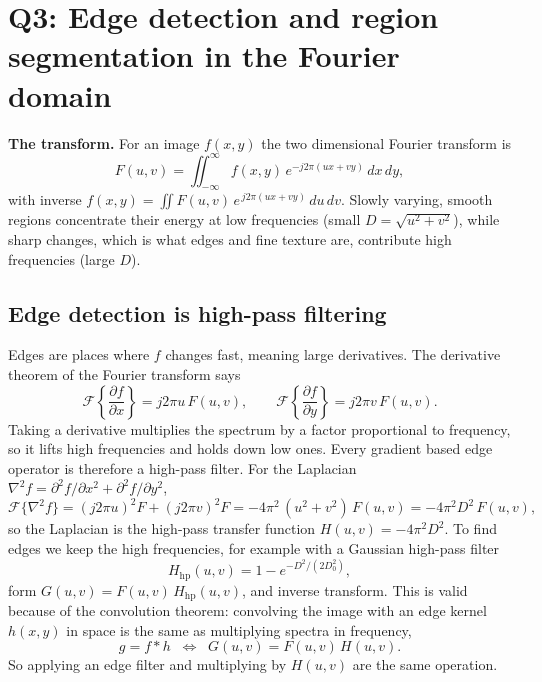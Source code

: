 \documentclass[11pt]{article}
\begin{document}
\section{Q3: Edge detection and region segmentation in the Fourier domain}
\label{sec:theory}
\textbf{The transform.} For an image $f(x,y)$ the two dimensional Fourier
transform is
\begin{equation}
F(u,v)=\iint_{-\infty}^{\infty} f(x,y)\,e^{-j2\pi(ux+vy)}\,dx\,dy,
\end{equation}
with inverse $f(x,y)=\iint F(u,v)\,e^{\,j2\pi(ux+vy)}\,du\,dv$. Slowly varying,
smooth regions concentrate their energy at low frequencies (small
$D=\sqrt{u^2+v^2}$), while sharp changes, which is what edges and fine texture
are, contribute high frequencies (large $D$).

\subsection{Edge detection is high-pass filtering}
Edges are places where $f$ changes fast, meaning large derivatives. The
derivative theorem of the Fourier transform says
\begin{equation}
\mathcal{F}\!\left\{\frac{\partial f}{\partial x}\right\}=j2\pi u\,F(u,v),
\qquad
\mathcal{F}\!\left\{\frac{\partial f}{\partial y}\right\}=j2\pi v\,F(u,v).
\end{equation}
Taking a derivative multiplies the spectrum by a factor proportional to
frequency, so it lifts high frequencies and holds down low ones. Every gradient
based edge operator is therefore a high-pass filter. For the Laplacian
$\nabla^2 f=\partial^2 f/\partial x^2+\partial^2 f/\partial y^2$,
\begin{equation}
\mathcal{F}\{\nabla^2 f\}=(j2\pi u)^2F+(j2\pi v)^2F
=-4\pi^2\,(u^2+v^2)\,F(u,v)=-4\pi^2 D^2\,F(u,v),
\label{eq:lap}
\end{equation}
so the Laplacian is the high-pass transfer function $H(u,v)=-4\pi^2D^2$. To find
edges we keep the high frequencies, for example with a Gaussian high-pass filter
\begin{equation}
H_{\text{hp}}(u,v)=1-e^{-D^2/(2D_0^2)},
\end{equation}
form $G(u,v)=F(u,v)\,H_{\text{hp}}(u,v)$, and inverse transform. This is valid
because of the convolution theorem: convolving the image with an edge kernel
$h(x,y)$ in space is the same as multiplying spectra in frequency,
\begin{equation}
g=f * h \;\;\Longleftrightarrow\;\; G(u,v)=F(u,v)\,H(u,v).
\end{equation}
So applying an edge filter and multiplying by $H(u,v)$ are the same operation.
\end{document}
